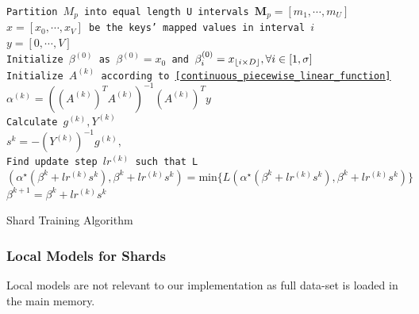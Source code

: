 \begin{algorithm}[H]
    \SetAlgoLined
    \texttt{Partition $M_{p}$ into equal length U intervals $\boldsymbol{M}_p=[m_1,\cdots, m_U]$ }
    {   
        \texttt{$x =[x_0,\cdots, x_V] $ be the keys' mapped values
        in interval $i$} \\
        \texttt{$y =[0,\cdots, V]$ } \\
        \texttt{Initialize $\beta^{(0)}$ as $\beta^{(0)}=x_0$ and $\beta_i^{(0)}=x_{\lfloor i\times D\rfloor}, \forall i\in[1,\sigma]$} \\
        {
            \texttt{Initialize $A^{(k)}$ according to \eqref{continuous_piecewise_linear_function}} \\
            \texttt{$\alpha^{(k)}= ((A^{(k)})^T A^{(k)})^{-1}(A^{(k)})^Ty$} \\
            
            \texttt{Calculate $g^{(k)}, Y^{(k)}$ } \\
            \texttt{$s^{k} = -(Y^{(k)})^{-1} g^{(k)}, $ } \\
            
            \texttt{Find update step $lr^{(k)}$ such that    L$(\alpha^\star(\beta^{k}+ lr^{(k)}s^{k}), \beta^{k}+ lr^{(k)}s^{k}) =\text{min}\{L(\alpha^\star(\beta^{k}+ lr^{(k)}s^{k}), \beta^{k}+ lr^{(k)}s^{k})\} $} \\
            
            \texttt{$\beta^{k+1} = \beta^{k}+ lr^{(k)}s^{k}$ } \\
        }
    }
    
    \caption{Shard Training Algorithm}
    \label{Shard_Training_Lisa}
\end{algorithm}

\subsubsection{Local Models for Shards}
Local models are not relevant to our implementation as full data-set is loaded in the main memory.  
